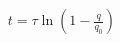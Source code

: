 \documentclass[preview]{standalone}
\begin{document}
\begin{align*}
t=\tau \ln\left( 1-\frac{q}{q_{0}} \right)
\end{align*}
\end{document}
